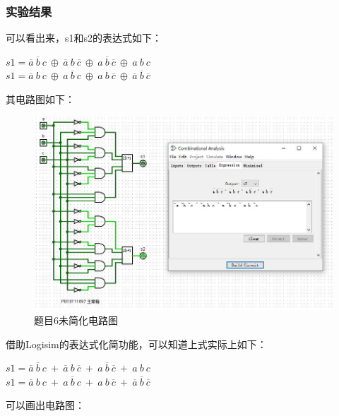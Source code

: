 \documentclass[UTF8]{article}
\begin{document}
	\subsubsection{实验结果}
	可以看出来，s1和s2的表达式如下：
	\begin{center}
		$s1 = \overline{a}\ \overline{b}\ c\ \oplus\ \overline{a}\ b\ \overline{c}\ \oplus\ a\ \overline{b}\ \overline{c}\ \oplus\ a\ b\ c$\\
		$s1 = \overline{a}\ b\ c\ \oplus\ a\ \overline{b}\ c\ \oplus\ a\ b\ \overline{c}\ \oplus\ \overline{a}\ \overline{b}\ \overline{c}$\\
	\end{center}\par
	其电路图如下：
	\begin{figure}[H]
		\centering
		\includegraphics[scale=0.6]{Problem6_Curcuit_Complex.jpg}
		\caption{题目6未简化电路图}
		\label{Problem6_Curcuit_Complex}
	\end{figure}\par
	借助Logisim的表达式化简功能，可以知道上式实际上如下：
	\begin{center}
		$s1 = \overline{a}\ \overline{b}\ c\ +\ \overline{a}\ b\ \overline{c}\ +\ a\ \overline{b}\ \overline{c}\ +\ a\ b\ c$\\
		$s1 = \overline{a}\ b\ c\ +\ a\ \overline{b}\ c\ +\ a\ b\ \overline{c}\ +\ \overline{a}\ \overline{b}\ \overline{c}$\\
	\end{center}\par
	可以画出电路图：
\end{document}
